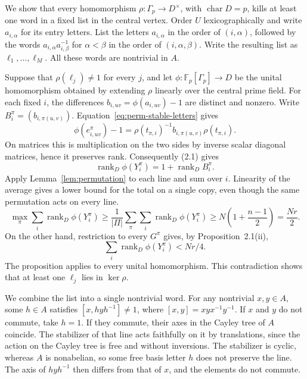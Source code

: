 \documentclass[11pt,a4paper]{article}
\numberwithin{equation}{section}
\begin{document}
We show that every homomorphism
\(\rho:\Gamma_p\to D^\times\), with \(\operatorname{char}D=p\), kills
at least one word in a fixed list in the central vertex. Order \(U\)
lexicographically and write \(a_{i,\alpha}\) for its entry letters.
List the letters \(a_{i,\alpha}\) in the order of \((i,\alpha)\),
followed by the words
\(a_{i,\alpha}a_{i,\beta}^{-1}\) for \(\alpha<\beta\) in the order of
\((i,\alpha,\beta)\). Write the resulting list as
\(\ell_1,\ldots,\ell_M\). All these words are nontrivial in \(A\).

Suppose that \(\rho(\ell_j)\ne1\) for every \(j\), and let
\(\phi:\mathbb F_p[\Gamma_p]\to D\) be the unital homomorphism
obtained by extending \(\rho\) linearly over the central prime
field. For each fixed \(i\), the differences
\(b_{i,uv}=\phi(a_{i,uv})-1\) are distinct and nonzero. Write
\(B_i^\pi=(b_{i,\pi(u,v)})\). Equation~\eqref{eq:perm-stable-letters}
gives
\[
 \phi(e^\pi_{i,uv})-1
 =\rho(t_{\pi,i})^{-1} b_{i,\pi(u,v)}\rho(t_{\pi,i}).
\]
On matrices this is multiplication on the two sides by inverse
scalar diagonal matrices, hence it preserves rank. Consequently
(2.1) gives
\begin{equation}\label{eq:perm-rank-match}
 \operatorname{rank}_D\phi(Y_i^\pi)=1+\operatorname{rank}_D B_i^\pi .
\end{equation}
Apply Lemma~\ref{lem:permutation} to each line and sum over \(i\).
Linearity of the average gives a lower bound for the total on a
single copy, even though the same permutation acts on every line.
\begin{equation}\label{eq:perm-lower}
 \max_\pi\sum_i\operatorname{rank}_D\phi(Y_i^\pi)
 \ge \frac{1}{|\Pi|}\sum_\pi\sum_i\operatorname{rank}_D\phi(Y_i^\pi)
 \ge N\left(1+\frac{n-1}{2}\right)=\frac{Nr}{2}.
\end{equation}
On the other hand, restriction to every \(G^\pi\) gives, by
Proposition~2.1(ii),
\begin{equation}\label{eq:perm-upper}
 \sum_i\operatorname{rank}_D\phi(Y_i^\pi)<Nr/4 .
\end{equation}
The proposition applies to every unital homomorphism. This
contradiction shows that at least one
\(\ell_j\) lies in \(\ker\rho\).

We combine the list into a single nontrivial word. For any nontrivial
\(x,y\in A\), some \(h\in A\) satisfies
\([x,hyh^{-1}]\ne1\), where \([x,y]=xyx^{-1}y^{-1}\). If \(x\) and
\(y\) do not commute, take \(h=1\). If they commute, their axes in
the Cayley tree of \(A\) coincide. The stabilizer of that line
acts faithfully on it by translations, since the action on the
Cayley tree is free and without inversions. The stabilizer is cyclic,
whereas \(A\) is nonabelian, so some free basis letter \(h\) does not
preserve the line. The axis of \(hyh^{-1}\) then differs from that
of \(x\), and the elements do not commute.
\end{document}
